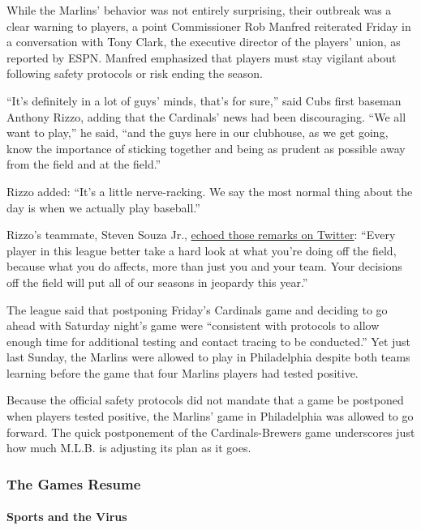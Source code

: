 While the Marlins' behavior was not entirely surprising, their outbreak
was a clear warning to players, a point Commissioner Rob Manfred
reiterated Friday in a conversation with Tony Clark, the executive
director of the players' union, as reported by ESPN. Manfred emphasized
that players must stay vigilant about following safety protocols or risk
ending the season.

``It's definitely in a lot of guys' minds, that's for sure,'' said Cubs
first baseman Anthony Rizzo, adding that the Cardinals' news had been
discouraging. ``We all want to play,'' he said, ``and the guys here in
our clubhouse, as we get going, know the importance of sticking together
and being as prudent as possible away from the field and at the field.''

Rizzo added: ``It's a little nerve-racking. We say the most normal thing
about the day is when we actually play baseball.''

Rizzo's teammate, Steven Souza Jr.,
\href{https://twitter.com/SouzaJr/status/1289345224339152896}{echoed
those remarks on Twitter}: ``Every player in this league better take a
hard look at what you're doing off the field, because what you do
affects, more than just you and your team. Your decisions off the field
will put all of our seasons in jeopardy this year.''

The league said that postponing Friday's Cardinals game and deciding to
go ahead with Saturday night's game were ``consistent with protocols to
allow enough time for additional testing and contact tracing to be
conducted.'' Yet just last Sunday, the Marlins were allowed to play in
Philadelphia despite both teams learning before the game that four
Marlins players had tested positive.

Because the official safety protocols did not mandate that a game be
postponed when players tested positive, the Marlins' game in
Philadelphia was allowed to go forward. The quick postponement of the
Cardinals-Brewers game underscores just how much M.L.B. is adjusting its
plan as it goes.

\hypertarget{the-games-resume}{%
\subsubsection{The Games Resume}\label{the-games-resume}}

\hypertarget{sports-and-the-virus}{%
\paragraph{Sports and the Virus}\label{sports-and-the-virus}}

